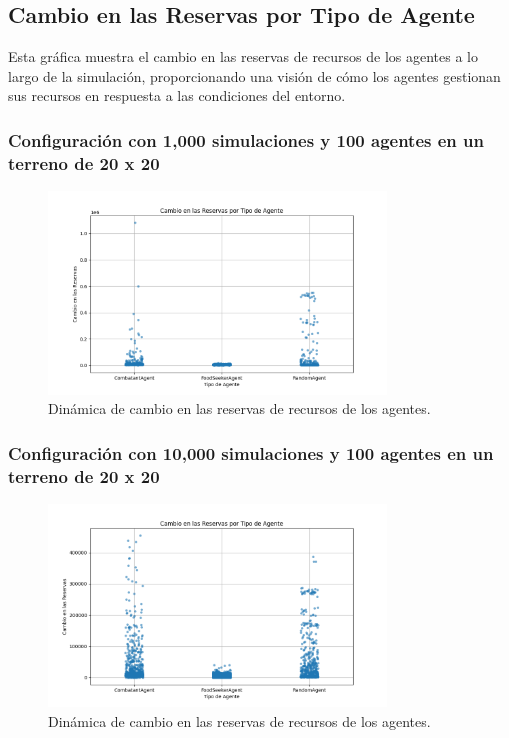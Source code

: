 \documentclass[11pt]{article}
\begin{document}
\subsection{Cambio en las Reservas por Tipo de Agente}
Esta gráfica muestra el cambio en las reservas de recursos de los agentes a lo largo de la simulación, proporcionando una visión de cómo los agentes gestionan sus recursos en respuesta a las condiciones del entorno.

\subsubsection{Configuración con 1,000 simulaciones y 100 agentes en un terreno de 20 x 20}
\begin{figure}[H]
    \centering
    \includegraphics[width=0.8\textwidth]{images/Figure_4.png}
    \caption{Dinámica de cambio en las reservas de recursos de los agentes.}
\end{figure}

\subsubsection{Configuración con 10,000 simulaciones y 100 agentes en un terreno de 20 x 20}
\begin{figure}[H]
    \centering
    \includegraphics[width=0.8\textwidth]{images/reserves_change_num_simulations10000_size20x20_agents_count100.png}
    \caption{Dinámica de cambio en las reservas de recursos de los agentes.}
\end{figure}
\end{document}
